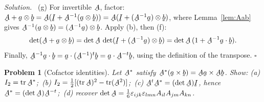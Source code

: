 \documentclass[17pt,a4paper]{extreport}
\DeclareRobustCommand{\vek}[1]{\underaccent{\tilde}{#1}}
\newcommand{\tr}{\operatorname{tr}}
\newcommand{\I}{\vek{I}}
\newcommand{\ba}{\vek{a}}
\newcommand{\bb}{\vek{b}}
\newcommand{\bA}{\vek{A}}
\newcommand{\eps}{\varepsilon}
\newcommand{\ip}[2]{#1\cdot#2}
\theoremstyle{scplain}
\theoremstyle{scdefn}
\theoremstyle{scplain}
\newtheorem{problem}{Problem}
\newenvironment{solution}
 {\par\smallskip\noindent\textit{Solution.}\ }
 {\hfill$\square$\par\medskip}
\begin{document}
\begin{solution}
(g) For invertible $\bA$, factor:
$\bA+\ba\otimes\bb=\bA(\I+\bA^{-1}(\ba\otimes\bb))
=\bA(\I+(\bA^{-1}\ba)\otimes\bb)$,
where Lemma~\ref{lem:Aab} gives
$\bA^{-1}(\ba\otimes\bb)=(\bA^{-1}\ba)\otimes\bb$. Apply (b), then (f):
\[
\det(\bA+\ba\otimes\bb)=\det\bA\,\det(\I+(\bA^{-1}\ba)\otimes\bb)
=\det\bA\,(1+\ip{\bA^{-1}\ba}\bb).
\]
Finally, $\ip{\bA^{-1}\ba}\bb=\ip\ba{(\bA^{-1})^t\bb}=\ip\ba{\bA^{-t}\bb}$,
using the definition of the transpose.
\end{solution}

\begin{problem}[Cofactor identities]
Let $\bA^{*}$ satisfy $\bA^{*}(\ba\times\bb)=\bA\ba\times\bA\bb$. Show:
(a) $I_2=\tr\bA^{*}$;\ (b) $I_2=\tfrac12[(\tr\bA)^2-\tr(\bA^2)]$;\
(c) $\bA^{t}\bA^{*}=(\det\bA)\I$, hence $\bA^{*}=(\det\bA)\bA^{-t}$;\
(d) recover $\det\bA=\tfrac16\eps_{ijk}\eps_{lmn}A_{il}A_{jm}A_{kn}$.
\end{problem}
\end{document}
